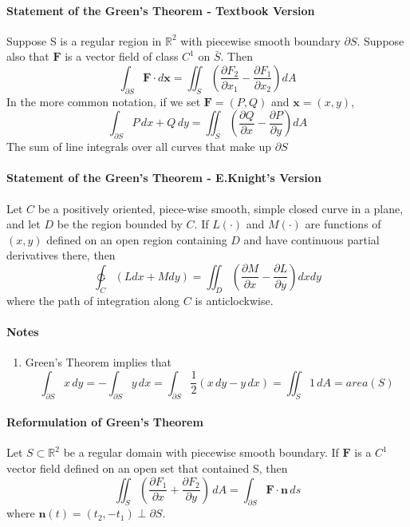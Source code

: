 \documentclass[11pt]{article}
\newcommand{\tb}[1]{\textbf{#1}}
\newcommand{\real}[0]{\mathbb{R}}
\newcommand{\vx}[0]{\tb{x}}
\newcommand{\vf}[0]{\tb{F}}
\begin{document}
\paragraph{Statement of the Green's Theorem - Textbook Version}
Suppose S is a regular region in $\real^2$ with piecewise smooth boundary $\partial S$. Suppose also that $\tb{F}$ is a vector field of class $C^1$ on $\bar{S}$. Then
$$\int_{\partial S}\tb{F}\cdot d\vx = \iint_S(\frac{\partial F_2}{\partial x_1} - \frac{\partial F_1}{\partial x_2})dA$$
In the more common notation, if we set $\tb{F} = (P,Q)$ and $\vx = (x,y)$,
$$\int_{\partial S}P \, dx + Q \, dy = \iint_S(\frac{\partial Q}{\partial x} - \frac{\partial P}{\partial y})dA$$
The sum of line integrals over all curves that make up $\partial S$

\paragraph{Statement of the Green's Theorem - E.Knight's Version} Let $C$ be a positively oriented, piece-wise smooth, simple closed curve in a plane, and let $D$ be the region bounded by $C$. If $L(\cdot)$ and $M(\cdot)$ are functions of $(x, y)$ defined on an open region containing $D$ and have continuous partial derivatives there, then
\begin{equation*}
    \ointctrclockwise_C \left(Ldx + Mdy\right) = \iint_D \left(\frac{\partial M}{\partial x} - \frac{\partial L}{\partial y}\right) dxdy
\end{equation*}
where the path of integration along $C$ is anticlockwise.

\paragraph{Notes}
\begin{enumerate}
	\item Green's Theorem implies that $$\int_{\partial S} x \, dy = -\int_{\partial S} y \, dx = \int_{\partial S} \frac{1}{2}(x\,dy - y\,dx) = \iint_S 1 \, dA = area(S)$$
\end{enumerate}
\paragraph{Reformulation of Green's Theorem}
Let $S \subset \real^2$ be a regular domain with piecewise smooth boundary. If $\vf$ is a $C^1$ vector field defined on an open set that contained S, then
$$\iint_S (\frac{\partial F_1}{\partial x} + \frac{\partial F_2}{\partial y})\, dA = \int_{\partial S}\vf \cdot \tb{n} \, ds$$
where $\tb{n}(t) = (t_2, -t_1) \perp \partial S$.
\end{document}
